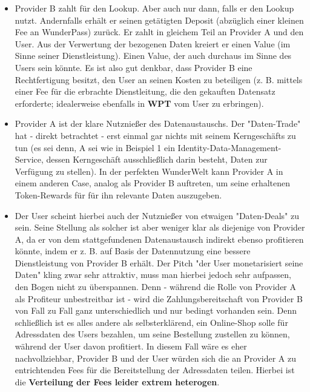 \begin{Solution}
\begin{itemize}
  \item Provider B zahlt für den Lookup. Aber auch nur dann, falls er den Lookup nutzt. Andernfalls erhält er seinen getätigten Deposit (abzüglich einer kleinen Fee an WunderPass) zurück. Er zahlt in gleichem Teil an Provider A und den User. Aus der Verwertung der bezogenen Daten kreiert er einen Value (im Sinne seiner Dienstleistung). Einen Value, der auch durchaus im Sinne des Users sein könnte. Es ist also gut denkbar, dass Provider B eine Rechtfertigung besitzt, den User an seinen Kosten zu beteiligen (z. B. mittels einer Fee für die erbrachte Dienstleitung, die den gekauften Datensatz erforderte; idealerweise ebenfalls in \textbf{WPT} vom User zu erbringen).
  \item Provider A ist der klare Nutznießer des Datenaustauschs. Der "Daten-Trade" hat - direkt betrachtet - erst einmal gar nichts mit seinem Kerngeschäfts zu tun (es sei denn, A sei wie in Beispiel 1 ein Identity-Data-Management-Service, dessen Kerngeschäft ausschließlich darin besteht, Daten zur Verfügung zu stellen). In der perfekten WunderWelt kann Provider A in einem anderen Case, analog als Provider B auftreten, um seine erhaltenen Token-Rewards für für ihn relevante Daten auszugeben.
  \item Der User scheint hierbei auch der Nutznießer von etwaigen "Daten-Deals" zu sein. Seine Stellung als solcher ist aber weniger klar als diejenige von Provider A, da er von dem stattgefundenen Datenaustausch indirekt ebenso profitieren könnte, indem er z. B. auf Basis der Datennutzung eine bessere Dienstleistung von Provider B erhält. Der Pitch "der User monetarisiert seine Daten" kling zwar sehr attraktiv, muss man hierbei jedoch sehr aufpassen, den Bogen nicht zu überspannen. Denn - während die Rolle von Provider A als Profiteur unbestreitbar ist - wird die Zahlungsbereitschaft von Provider B von Fall zu Fall ganz unterschiedlich und nur bedingt vorhanden sein. Denn schließlich ist es alles andere als selbsterklärend, ein Online-Shop solle für Adressdaten des Users bezahlen, um seine Bestellung zustellen zu können, während der User davon profitiert. In diesem Fall wäre es eher nachvollziehbar, Provider B und der User würden sich die an Provider A zu entrichtenden Fees für die Bereitstellung der Adressdaten teilen. Hierbei ist die \textbf{Verteilung der Fees leider extrem heterogen}.
\end{itemize} 

\end{Solution}


\vspace{0.3cm}


\vspace{0.5cm}
